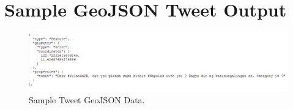 


\chapter{Sample GeoJSON Tweet Output}

\begin{figure}[hbt!]
    \includegraphics[width=\textwidth, height=\textheight,keepaspectratio]{GeoQuery.PNG}
    \caption{Sample Tweet GeoJSON Data.}
\end{figure}